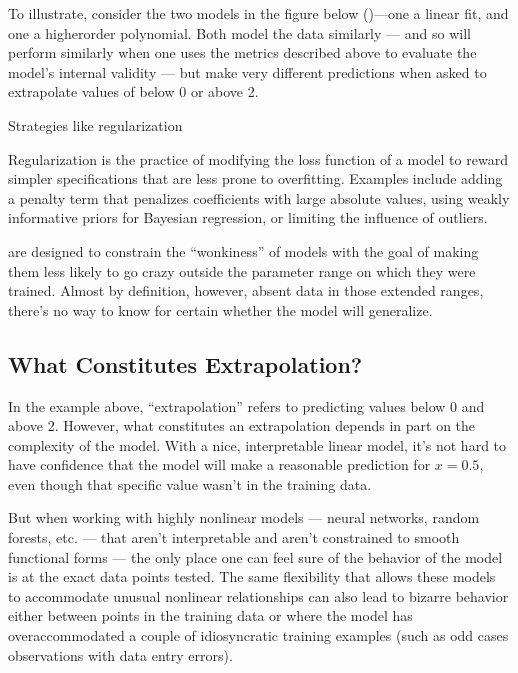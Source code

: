 \documentclass[letterpaper,10pt,english]{jupyterBook}
\begin{document}
\sphinxAtStartPar
To illustrate, consider the two models in the figure below ()—one a linear fit, and one a higher\sphinxhyphen{}order polynomial. Both model the data similarly  — and so will perform similarly when one uses the metrics described above to evaluate the model’s internal validity — but make very different predictions when asked to extrapolate values of  below 0 or above 2.

\sphinxAtStartPar
{}

\sphinxAtStartPar
Strategies like regularization%
\begin{footnote}[1]\sphinxAtStartFootnote
Regularization is the practice of modifying the loss function of a model to reward simpler specifications that are less prone to overfitting. Examples include adding a penalty term that penalizes coefficients with large absolute values, using weakly informative priors for Bayesian regression, or limiting the influence of outliers.
%
\end{footnote} are designed to constrain the “wonkiness” of models with the goal of making them less likely to go crazy outside the parameter range on which they were trained. Almost by definition, however, absent data in those extended ranges, there’s no way to know for certain whether the model will generalize.


\subsection{What Constitutes Extrapolation?}
\label{\detokenize{30_questions/27_passive_external_general:what-constitutes-extrapolation}}
\sphinxAtStartPar
In the example above, “extrapolation” refers to predicting values below 0 and above 2. However, what constitutes an extrapolation depends in part on the complexity of the model. With a nice, interpretable linear model, it’s not hard to have confidence that the model will make a reasonable prediction for \(x=0.5\), even though that specific value wasn’t in the training data.

\sphinxAtStartPar
But when working with highly non\sphinxhyphen{}linear models — neural networks, random forests, etc. — that aren’t interpretable and aren’t constrained to smooth functional forms — the only place one can feel sure of the behavior of the model is at the exact data points tested. The same flexibility that allows these models to accommodate unusual non\sphinxhyphen{}linear relationships can also lead to bizarre behavior either between points in the training data or where the model has over\sphinxhyphen{}accommodated a couple of idiosyncratic training examples (such as odd cases  observations with data entry errors).
\end{document}
